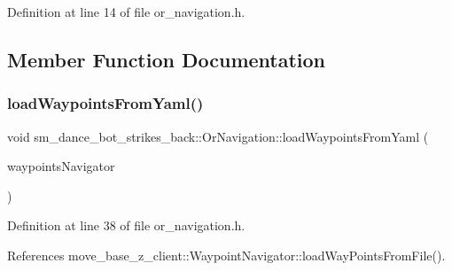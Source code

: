 Definition at line 14 of file or\+\_\+navigation.\+h.



\subsection{Member Function Documentation}
\mbox{\label{classsm__dance__bot__strikes__back_1_1OrNavigation_abd8811831075be61ad28fe4a68fc738d}} 
\subsubsection{\texorpdfstring{load\+Waypoints\+From\+Yaml()}{loadWaypointsFromYaml()}}
{\footnotesize\ttfamily void sm\+\_\+dance\+\_\+bot\+\_\+strikes\+\_\+back\+::\+Or\+Navigation\+::load\+Waypoints\+From\+Yaml (\begin{DoxyParamCaption}\item[{\hyperlink{classmove__base__z__client_1_1WaypointNavigator}{Waypoint\+Navigator} $\ast$}]{waypoints\+Navigator }\end{DoxyParamCaption})\hspace{0.3cm}{\ttfamily [inline]}}



Definition at line 38 of file or\+\_\+navigation.\+h.



References move\+\_\+base\+\_\+z\+\_\+client\+::\+Waypoint\+Navigator\+::load\+Way\+Points\+From\+File().


